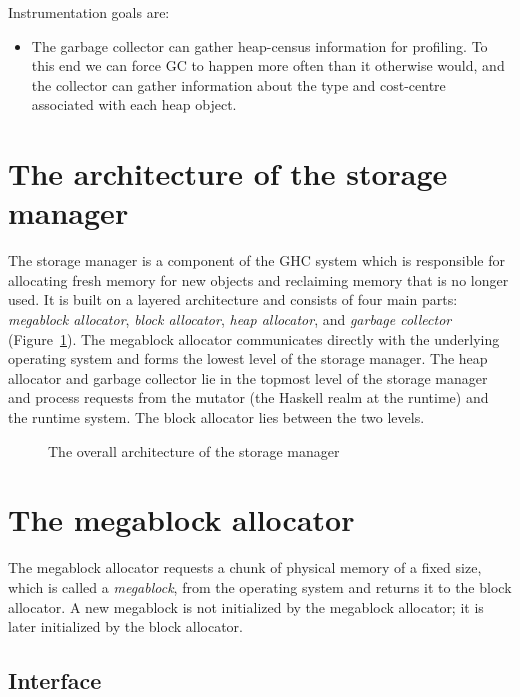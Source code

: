 \documentclass{article}
\begin{document}
Instrumentation goals are:
\begin{itemize}
\item The garbage collector can gather heap-census information for profiling.
To this end we can force GC to happen more often than it otherwise would,
and the collector can gather information about the type and cost-centre
associated with each heap object.
\end{itemize}

\section{The architecture of the storage manager}

The storage manager is a component of the GHC system which is responsible
for allocating fresh memory for new objects and reclaiming memory 
that is no longer used.
It is built on a layered architecture and consists of four main parts:
\emph{megablock allocator}, \emph{block allocator}, \emph{heap allocator}, 
and \emph{garbage collector} (Figure~\ref{fig-architecture}). 
The megablock allocator communicates directly with the underlying 
operating system and forms the lowest level of the storage manager.
The heap allocator and garbage collector lie in the topmost level of
the storage manager and process requests from 
the mutator (the Haskell realm at the runtime) and the runtime system.
The block allocator lies between the two levels. 

\begin{figure}[ht]
\begin{center}

\caption{The overall architecture of the storage manager}
\label{fig-architecture}
\end{center}
\end{figure}

\section{The megablock allocator}

The megablock allocator requests a chunk of physical memory of a fixed size,
which is called a \emph{megablock}, from the operating system and returns it
to the block allocator. A new megablock is not initialized by the
megablock allocator; it is later initialized by the block allocator.

\subsection{Interface}
\end{document}
